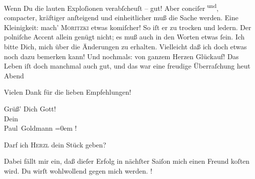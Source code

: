                Wenn Du die lauten Exploſionen verabſcheuſt – gut! Aber conciſer\substVorne{}\textsuperscript{{ }und}\substDazwischen{},\substHinten{} compacter, kräftiger anſteigend und einheitlicher muß die Sache werden. Eine
               Kleinigkeit: mach’ \textsc{Moritzki} etwas komiſcher! {\pb}So iſt er zu trocken und
               ledern. Der polniſche Accent allein genügt nicht;
               es muß auch in den Worten etwas ſein. Ich bitte Dich, mich über die Änderungen
                  \label{K_L02675-3v}\label{K_L02675-3} zu
               erhalten. Vielleicht daß ich doch etwas noch dazu bemerken kann! Und nochmals: von
               ganzem Herzen Glückauf! Das Leben iſt doch manchmal auch gut, und das war eine
               freudige Überraſchung heut{ }Abend{\dotsfour}\pend
           
\pstart
           Vielen Dank für die lieben Empfehlungen!\pend
           
\pstart
           Grüß’ Dich Gott! {\\[\baselineskip]}Dein {\\[\baselineskip]}\spacefill\mbox{Paul Goldmann}\pend
           \leftskip=0em{}
\pstart
           \noindent{}\label{K_L02675-4v}\label{K_L02675-4}!\pend
           
\pstart
           {\pb}Darf ich \textsc{Herzl} dein Stück geben?\pend
           
\pstart
           Dabei fällt mir ein, daß dieſer Erfolg in nächſter Saiſon mich einen Freund koſten
                  wird.  Du wirſt wohlwollend gegen mich werden.
                     \label{K_L02675-5v}\label{K_L02675-5}!\pend
           \endnumbering{}  
      